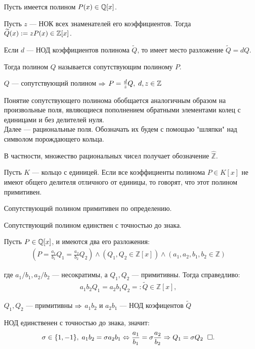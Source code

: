 \documentclass{article}
\begin{document}

\newcommand\Qt{\widetilde{Q}}

Пусть имеется полином $P(x)\in\mathbb{Q}[x]$.

Пусть $z$ --- НОК всех знаменателей его коэффициентов. Тогда $\Qt(x):=zP(x)\in\Z[x]$.

Если $d$ ---  НОД коэффициентов полинома $\Qt$, то имеет место разложение $\Qt=dQ$.

Тогда полином $Q$  называется сопутствующим полиному $P$.

$Q$ --- сопутствующий полином $\Rightarrow$ $P=\frac{d}{z}Q,\;d,z\in\mathbb{Z}$

Понятие сопутствующего полинома обобщается аналогичным образом на произвольные поля, являющиеся пополнением обратными элементами колец с единицами и без делителей нуля.\\
Далее --- рациональные поля. Обозначать их будем с помощью "шляпки" над символом порождающего кольца.

В частности, множество рациональных чисел получает обозначение $\widehat{\mathbb{Z}}$.


Пусть $K$ --- кольцо с единицей. Если все коэффициенты полинома $P\in K[x]$
не имеют общего делителя отличного от единицы, то говорят, что этот полином
примитивен.

Сопутствующий полином примитивен по определению.

\theorem

Сопутствующий полином единствен с точностью до знака.

\proof

Пусть $P\in\mathbb{Q}[x]$, и имеются два его разложения:
\begin{align*}
	(P =\frac{a_1}{b_1} Q_1 = \frac{a_2}{b_2} Q_2)\land (Q_1, Q_2\in \mathbb{Z} [x])\land (a_1, a_2, b_1, b_2\in \mathbb{Z})
\end{align*}

где $a_1/b_1, a_2/b_2$ --- несократимы, а $Q_1, Q_2$ --- примитивны. Тогда справедливо:
\begin{align*}
	a_1 b_2 Q_1 = a_2 b_1 Q_2 =:\Qt\in\mathbb{Z} [x],
\end{align*}

$Q_1,Q_2$ --- примитивны $\Rightarrow$ $a_1b_2$ и $a_2b_1$ --- НОД коэфицентов $\Qt$

НОД единственен с точностью до знака, значит:
\begin{align*}
	\sigma\in\{1,-1\},\;a_1 b_2 =\sigma a_2 b_1 \Leftrightarrow \frac{a_1}{b_1} = \sigma\frac{a_2}{b_2} \Rightarrow Q_1 = \sigma Q_2~\;\square.
\end{align*}
\end{document}
